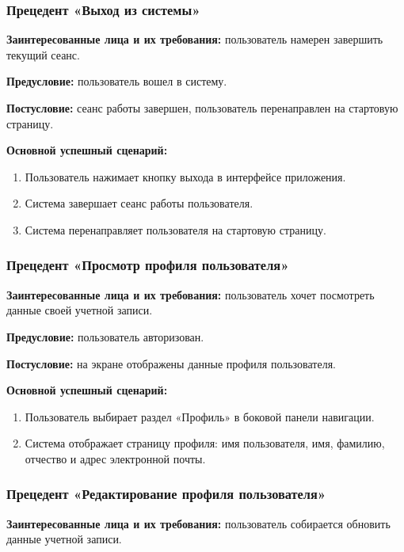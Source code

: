 \subsubsection{Прецедент «Выход из системы»}

\textbf{Заинтересованные лица и их требования:} пользователь намерен завершить текущий сеанс.

\textbf{Предусловие:} пользователь вошел в систему.

\textbf{Постусловие:} сеанс работы завершен, пользователь перенаправлен на стартовую страницу.

\textbf{Основной успешный сценарий:}
\begin{enumerate}
    \item Пользователь нажимает кнопку выхода в интерфейсе приложения.
    \item Система завершает сеанс работы пользователя.
    \item Система перенаправляет пользователя на стартовую страницу.
\end{enumerate}

\subsubsection{Прецедент «Просмотр профиля пользователя»}

\textbf{Заинтересованные лица и их требования:} пользователь хочет посмотреть данные своей учетной записи.

\textbf{Предусловие:} пользователь авторизован.

\textbf{Постусловие:} на экране отображены данные профиля пользователя.

\textbf{Основной успешный сценарий:}
\begin{enumerate}
    \item Пользователь выбирает раздел «Профиль» в боковой панели навигации.
    \item Система отображает страницу профиля: имя пользователя, имя, фамилию, отчество и адрес электронной почты.
\end{enumerate}

\subsubsection{Прецедент «Редактирование профиля пользователя»}

\textbf{Заинтересованные лица и их требования:} пользователь собирается обновить данные учетной записи.

